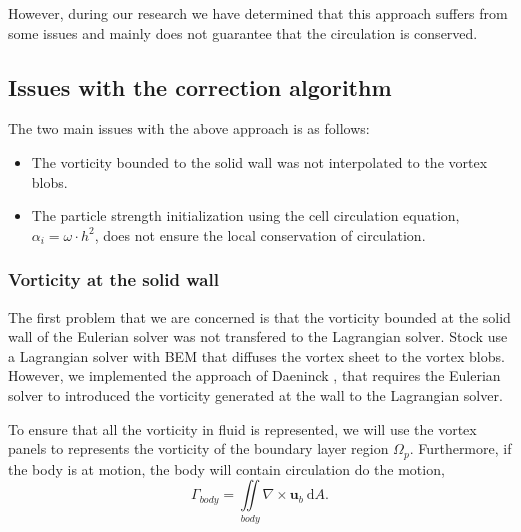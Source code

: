However, during our research we have determined that this approach suffers from some issues and mainly does not guarantee that the circulation is conserved.

\subsection{Issues with the correction algorithm}

The two main issues with the above approach is as follows:

\begin{itemize}
\item The vorticity bounded to the solid wall was not interpolated to the vortex blobs. 
\item The particle strength initialization using the cell circulation equation, $\alpha_i = \omega \cdot h^2$, does not ensure the local conservation of circulation. %
\end{itemize}

\subsubsection{Vorticity at the solid wall}



The first problem that we are concerned is that the vorticity bounded at the solid wall of the Eulerian solver was not transfered to the Lagrangian solver. Stock \cite{Stock2010a} use a Lagrangian solver with BEM that diffuses the vortex sheet to the vortex blobs. However, we implemented the approach of Daeninck \cite{Daeninck2006}, that requires the Eulerian solver to introduced the vorticity generated at the wall to the Lagrangian solver.

To ensure that all the vorticity in fluid is represented, we will use the vortex panels to represents the vorticity of the boundary layer region $\Omega_p$. Furthermore, if the body is at motion, the body will contain circulation do the motion,
	\begin{equation}
	\Gamma_{body} = \iint\limits_{body} \nabla \times \mathbf{u}_b \ \mathrm{d} A.
	\end{equation}

